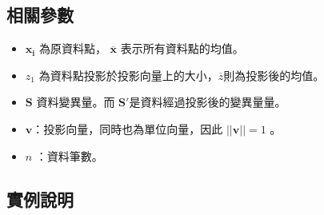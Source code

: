 \subsection{相關參數}
\begin{itemize}
	\item
	      \(\mathbf{x_i}\) 為原資料點， \(\mathbf{\overline{x}}\) 表示所有資料點的均值。
	\item
	      \(z_1\) 為資料點投影於投影向量上的大小，\(\overline{z}\)則為投影後的均值。
	\item
	      \(\mathbf{S}\) 資料變異量。而 \(\mathbf{{S}'}\)是資料經過投影後的變異量量。
	\item
	      \(\mathbf{v}\)：投影向量，同時也為單位向量，因此 \(||\mathbf{v}||=1\)  。
	\item
	      \(n\) ：資料筆數。
\end{itemize}


\subsection{實例說明}

